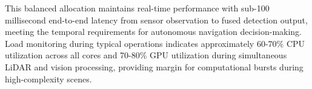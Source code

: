 This balanced allocation maintains real-time performance with sub-100 millisecond end-to-end latency from sensor observation to fused detection output, meeting the temporal requirements for autonomous navigation decision-making.
Load monitoring during typical operations indicates approximately 60-70\% CPU utilization across all cores and 70-80\% GPU utilization during simultaneous LiDAR and vision processing, providing margin for computational bursts during high-complexity scenes.





